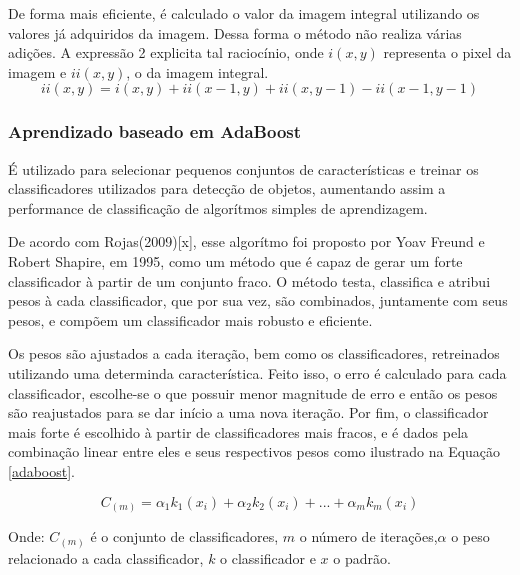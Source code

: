 \documentclass[a4paper,12pt]{article}
\begin{document}
\hspace{4ex}De forma mais eficiente, é calculado o valor da imagem integral utilizando os valores já adquiridos da imagem. Dessa forma o método não realiza várias adições. A expressão 2 explicita tal raciocínio, onde $i(x,y)$ representa o pixel da imagem e $ii(x,y)$, o da imagem integral.
\begin{equation}\label{eq:imgintotm}
	ii(x,y)=i(x,y)+ii(x-1,y)+ii(x,y-1)-ii(x-1,y-1)	
\end{equation}


\thispagestyle{main}
\subsubsection{Aprendizado baseado em AdaBoost}

\hspace{4ex}É utilizado para selecionar pequenos conjuntos de características e treinar os classificadores utilizados para detecção de objetos, aumentando assim a performance de classificação de algorítmos simples de aprendizagem.

\hspace{4ex}De acordo com Rojas(2009)[x], esse algorítmo foi proposto por Yoav Freund e Robert Shapire, em 1995, como um método que é capaz de gerar um forte classificador à partir de um conjunto fraco. O método testa, classifica e atribui pesos à cada classificador, que por sua vez, são combinados, juntamente com seus pesos, e compõem um classificador mais robusto e eficiente.

\hspace{4ex}Os pesos são ajustados a cada iteração, bem como os classificadores, retreinados utilizando uma determinda característica. Feito isso, o erro é calculado para cada classificador, escolhe-se o que possuir menor magnitude de erro e então os pesos são reajustados para se dar início a uma nova iteração. Por fim, o classificador mais forte é escolhido à partir de classificadores mais fracos, e é dados pela combinação linear entre eles e seus respectivos pesos como ilustrado na Equação \ref{adaboost}.

\begin{equation}\label{adaboost}
	C_{(m)}=\alpha_{1}k_{1}(x_{i}) +\alpha_{2}k_{2}(x_{i})+...+\alpha_{m}k_{m}(x_{i})
\end{equation}

\hspace{4ex}Onde: $C_{(m)}$ é o conjunto de classificadores, $m$ o número de iterações,$\alpha$ o peso relacionado a cada classificador, $k$ o classificador e $x$ o padrão. 
\end{document}
